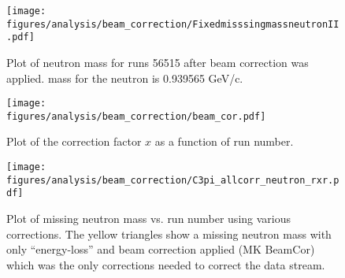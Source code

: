     \begin{figure}[h!]\begin{center}
    \texttt{[image: \\figures/analysis/beam\_correction/FixedmisssingmassneutronII.pdf]}
    \caption[Plot of neutron mass for runs 56515 after beam correction was applied]{\label{fig:neutron.fix} Plot of neutron mass for runs 56515 after beam correction was applied.   mass for the neutron is 0.939565 GeV/c.}
    \end{center}\end{figure}
    
    \begin{figure}[h!]\begin{center}
    \texttt{[image: \\figures/analysis/beam\_correction/beam\_cor.pdf]}
    \caption[Plot of the correction factor $x$ as a function of run number]{\label{fig:beamcor.run} Plot of the correction factor $x$ as a function of run number.}
    \end{center}\end{figure}
    
    \begin{figure}[h!]\begin{center}
    \texttt{[image: \\figures/analysis/beam\_correction/C3pi\_allcorr\_neutron\_rxr.pdf]}
    \caption[Plot of missing neutron mass vs. run number using various corrections]{\label{fig:neutron.fixall} Plot of missing neutron mass vs. run number using various corrections. The yellow triangles show a missing neutron mass with only ``energy-loss'' and beam correction applied (MK BeamCor) which was the only corrections needed to correct the  data stream.}
    \end{center}\end{figure}
    
    
    \FloatBarrier
